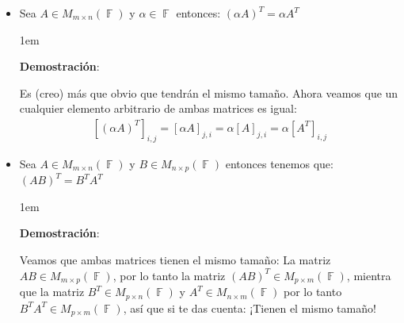 \documentclass[12pt, fleqn]{report}                             %
\newenvironment{SmallIndentation}[1][0.75em]                    %
        {\begin{adjustwidth}{#1}{}\begin{footnotesize}}             %
        {\end{footnotesize}\end{adjustwidth}}                       %
\theoremstyle{break}                                            %
\DeclareMathOperator \GenericField {\mathbb{F}}                 %
\begin{document}
\begin{itemize}
\begin{SmallIndentation}[1em]
                        \end{SmallIndentation}

                    \clearpage

                    \item Sea $A \in M_{m \times n}(\GenericField)$ y $\alpha \in \GenericField$ entonces:
                        $(\alpha A)^T = \alpha A^T$
                        
                        \begin{SmallIndentation}[1em]
                            \textbf{Demostración}:

                            Es (creo) más que obvio que tendrán el mismo tamaño.
                            Ahora veamos que un cualquier elemento arbitrario de ambas matrices es igual:
                            \begin{equation*}
                            \begin{split}
                                [(\alpha A)^T]_{i, j}    
                                    = [\alpha A]_{j, i}               
                                    = \alpha [A]_{j, i}
                                    = \alpha [A^T]_{i, j}
                            \end{split}
                            \end{equation*}

                        \end{SmallIndentation}
                                    

                    \item Sea $A \in M_{m \times n}(\GenericField)$ y $B \in M_{n \times p}(\GenericField)$
                        entonces tenemos que: $(AB)^T = B^T A^T$

                        \begin{SmallIndentation}[1em]
                            \textbf{Demostración}:

                            Veamos que ambas matrices tienen el mismo tamaño: 
                            La matriz $AB \in M_{m \times p}(\GenericField)$, por lo tanto la matriz
                            $(AB)^T \in M_{p \times m}(\GenericField)$, mientra que la matriz 
                            $B^T \in M_{p \times n}(\GenericField)$ y $A^T \in M_{n \times m}(\GenericField)$
                            por lo tanto $B^T A^T \in M_{p \times m}(\GenericField)$, así que si te das
                            cuenta: ¡Tienen el mismo tamaño!


\end{SmallIndentation}
\end{itemize}
\end{document}
